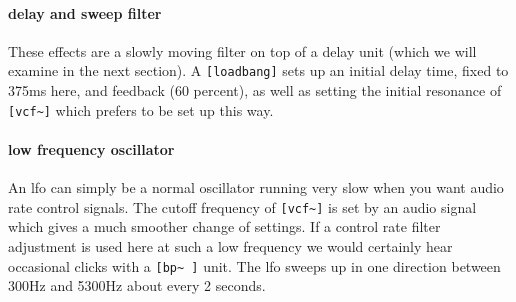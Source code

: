 \paragraph{delay and sweep filter}
These effects are a slowly moving filter on top of a delay 
unit (which we will examine in the next section). A \verb+[loadbang]+
sets up an initial delay time, fixed to 375ms here, and
feedback (60 percent), as well as setting the initial resonance
of \verb+[vcf~]+ which prefers to be set up this way.

\paragraph{low frequency oscillator}
An lfo can simply be a normal oscillator running very slow when
you want audio rate control signals. The cutoff frequency of 
\verb+[vcf~]+ is set by an audio signal which gives a much
smoother change of settings. If a control rate filter
adjustment is used here at such a low frequency we would certainly hear 
occasional clicks with a \verb+[bp~ ]+ unit. The lfo sweeps up
in one direction between 300Hz and 5300Hz about every 2 seconds.